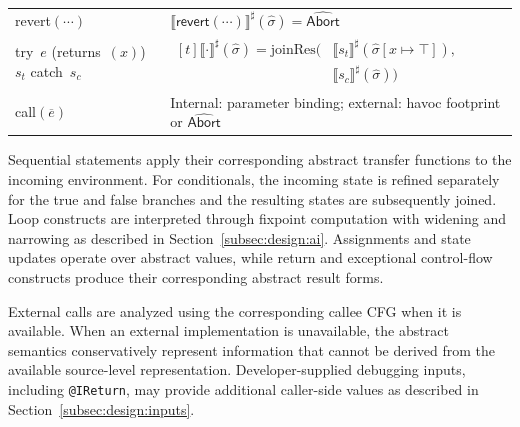 \documentclass[11pt,oneside]{report}
\theoremstyle{plain}
\theoremstyle{definition}
\theoremstyle{remark}
\newcommand{\Abort}{\mathsf{Abort}}
\begin{document}
\begin{table}[h]
\begin{tabularx}{\columnwidth}{@{}p{} X@{}}
    \textsf{revert}$(\cdots)$ &
    $\llbracket \textsf{revert}(\cdots)\rrbracket^\sharp(\hat{\sigma})=\widehat{\Abort}$\\

    \textsf{try}\ $e$ (\textsf{returns}\ $(x)$)\ $s_t$ \textsf{catch}\ $s_c$ &
    $\begin{aligned}[t]
      \llbracket \cdot\rrbracket^\sharp(\hat{\sigma})=\mathrm{joinRes}\!\big(
        &\llbracket s_t\rrbracket^\sharp(\hat{\sigma}[x\mapsto \top]), \\
        &\llbracket s_c\rrbracket^\sharp(\hat{\sigma})
      \big)
    \end{aligned}$\\

    \textsf{call}$(\overline{e})$ &
    Internal: parameter binding; external: havoc footprint or $\widehat{\Abort}$\\
    \bottomrule
  \end{tabularx}
\end{table}

Sequential statements apply their corresponding abstract transfer functions to the incoming environment.
For conditionals, the incoming state is refined separately for the true and false branches and the resulting states are subsequently joined.
Loop constructs are interpreted through fixpoint computation with widening and narrowing as described in Section~\ref{subsec:design:ai}.
Assignments and state updates operate over abstract values, while return and exceptional control-flow constructs produce their corresponding abstract result forms.

External calls are analyzed using the corresponding callee CFG when it is available.
When an external implementation is unavailable, the abstract semantics conservatively represent information that cannot be derived from the available source-level representation.
Developer-supplied debugging inputs, including \texttt{@IReturn}, may provide additional caller-side values as described in Section~\ref{subsec:design:inputs}.
\end{document}
